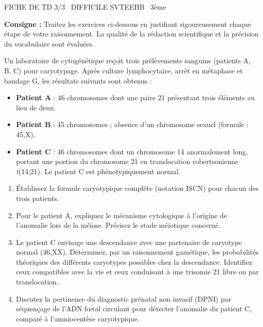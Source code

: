 \documentclass[11pt]{article}
\begin{document}
\begin{tcolorbox}[enhanced,colback=popink,colframe=popink,arc=10pt,boxrule=0pt,left=12pt,right=12pt,top=9pt,bottom=9pt]
{\color{white}\popxbold\small FICHE DE TD 3/3 \textbullet\ DIFFICILE \hfill SVTEEHB \textbullet\ 3ème\par}
\end{tcolorbox}
\vspace{4pt}
\noindent \textbf{Consigne :} Traitez les exercices ci-dessous en justifiant rigoureusement chaque étape de votre raisonnement. La qualité de la rédaction scientifique et la précision du vocabulaire sont évaluées.

\begin{exercice}
Un laboratoire de cytogénétique reçoit trois prélèvements sanguins (patients A, B, C) pour caryotypage. Après culture lymphocytaire, arrêt en métaphase et bandage G, les résultats suivants sont obtenus :

\begin{itemize}
    \item \textbf{Patient A} : 46 chromosomes dont une paire 21 présentant trois éléments au lieu de deux.
    \item \textbf{Patient B} : 45 chromosomes ; absence d'un chromosome sexuel (formule : 45,X).
    \item \textbf{Patient C} : 46 chromosomes dont un chromosome 14 anormalement long, portant une portion du chromosome 21 en translocation robertsonienne \textit{t}(14;21). Le patient C est phénotypiquement normal.
\end{itemize}

\begin{enumerate}
    \item Établissez la formule caryotypique complète (notation ISCN) pour chacun des trois patients.
    \item Pour le patient A, expliquez le mécanisme cytologique à l'origine de l'anomalie lors de la méiose. Précisez le stade méiotique concerné.
    \item Le patient C envisage une descendance avec une partenaire de caryotype normal (46,XX). Déterminez, par un raisonnement gamétique, les probabilités théoriques des différents caryotypes possibles chez la descendance. Identifiez ceux compatibles avec la vie et ceux conduisant à une trisomie 21 libre ou par translocation.
    \item Discutez la pertinence du diagnostic prénatal non invasif (DPNI) par séquençage de l'ADN fœtal circulant pour détecter l'anomalie du patient C, comparé à l'amniocentèse caryotypique.
\end{enumerate}
\end{exercice}
\end{document}
